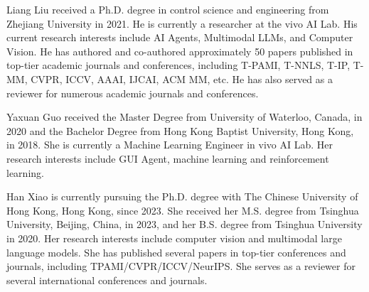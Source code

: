 \begin{IEEEbiography}{Liang Liu}
received a Ph.D. degree in control science and engineering from Zhejiang University in 2021. He is currently a researcher at the vivo AI Lab. His current research interests include AI Agents, Multimodal LLMs, and Computer Vision. He has authored and co-authored approximately 50 papers published in top-tier academic journals and conferences, including T-PAMI, T-NNLS, T-IP, T-MM, CVPR, ICCV, AAAI, IJCAI, ACM MM, etc. He has also served as a reviewer for numerous academic journals and conferences.
\end{IEEEbiography}

\vspace{-3em}

\begin{IEEEbiography}{Yaxuan Guo}
received the Master Degree from University of Waterloo, Canada, in 2020 and the Bachelor Degree from Hong Kong Baptist University, Hong Kong, in 2018. She is currently a Machine Learning Engineer in vivo AI Lab. Her research interests include GUI Agent, machine learning and reinforcement learning.
\end{IEEEbiography}

\vspace{-3em}

\begin{IEEEbiography}{Han Xiao}
is currently pursuing the Ph.D. degree with The Chinese University of Hong Kong, Hong Kong, since 2023. She received her M.S. degree from Tsinghua University, Beijing, China, in 2023, and her B.S. degree from Tsinghua University in 2020. Her research interests include computer vision and multimodal large language models. She has published several papers in top-tier conferences and journals, including TPAMI/CVPR/ICCV/NeurIPS. She serves as a reviewer for several international conferences and journals.
\end{IEEEbiography}

